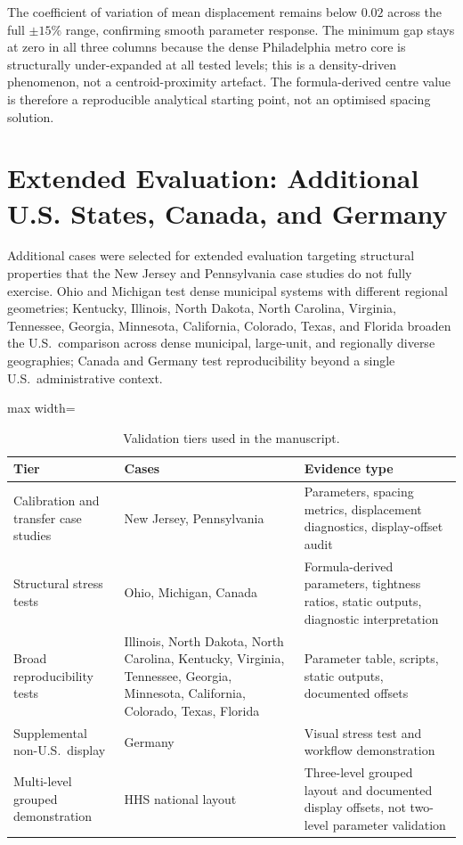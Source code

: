 \documentclass[12pt, a4paper]{article}
\numberwithin{equation}{section}
\begin{document}
\noindent The coefficient of variation of mean displacement remains below $0.02$
across the full $\pm 15\%$ range, confirming smooth parameter response. The minimum
gap stays at zero in all three columns because the dense Philadelphia metro core is
structurally under-expanded at all tested levels; this is a density-driven phenomenon,
not a centroid-proximity artefact. The formula-derived centre value is therefore a
reproducible analytical starting point, not an optimised spacing solution.

\section{Extended Evaluation: Additional U.S. States, Canada, and Germany}
\label{sec:extended}

Additional cases were selected for extended evaluation targeting structural properties that the New Jersey and Pennsylvania case studies do not fully exercise. Ohio and Michigan test dense municipal systems with different regional geometries; Kentucky, Illinois, North Dakota, North Carolina, Virginia, Tennessee, Georgia, Minnesota, California, Colorado, Texas, and Florida broaden the U.S.\ comparison across dense municipal, large-unit, and regionally diverse geographies; Canada and Germany test reproducibility beyond a single U.S.\ administrative context.

\begin{table}[H]
\centering
\caption{Validation tiers used in the manuscript.}
\label{tab:validation_tiers}
\begin{adjustbox}{max width=\textwidth}
\begin{tabular}{lll}
\toprule
\textbf{Tier} & \textbf{Cases} & \textbf{Evidence type} \\
\midrule
Calibration and transfer case studies & New Jersey, Pennsylvania & Parameters, spacing metrics, displacement diagnostics, display-offset audit \\
Structural stress tests & Ohio, Michigan, Canada & Formula-derived parameters, tightness ratios, static outputs, diagnostic interpretation \\
Broad reproducibility tests & Illinois, North Dakota, North Carolina, Kentucky, Virginia, Tennessee, Georgia, Minnesota, California, Colorado, Texas, Florida & Parameter table, scripts, static outputs, documented offsets \\
Supplemental non-U.S.\ display & Germany & Visual stress test and workflow demonstration \\
Multi-level grouped demonstration & HHS national layout & Three-level grouped layout and documented display offsets, not two-level parameter validation \\
\bottomrule
\end{tabular}
\end{adjustbox}
\end{table}
\end{document}
